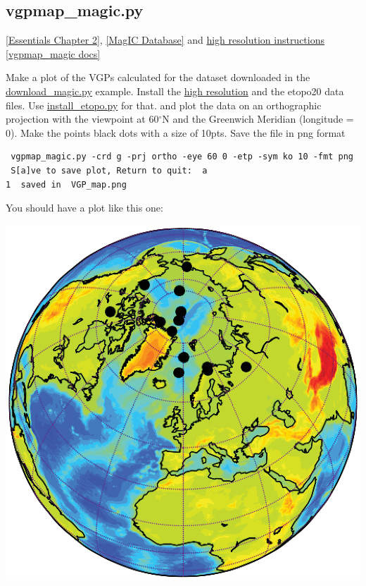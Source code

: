 \documentclass[11pt]{book}
\begin{document}
{

\subsection{vgpmap\_magic.py}
\href{http://earthref.org/MAGIC/books/Tauxe/Essentials/WebBook3ch2.html#ch2}{[Essentials Chapter 2]},  \href{#MagICDatabase}{[MagIC Database]} and   \href{#hires}{high resolution instructions}
\href{https://github.com/PmagPy/PmagPy/blob/master/programs/vgpmap_magic.py}{[vgpmap\_magic docs]}

Make a plot of the VGPs calculated for the dataset downloaded in the \href{#download_magic.py}{download\_magic.py} example.  Install the  \href{#hires}{high resolution} and the etopo20 data files. Use \href{#install_etopo.py}{install\_etopo.py}  for that.
and plot the data on an orthographic projection with the viewpoint at 60$^{\circ}$N and the Greenwich Meridian (longitude = 0).  Make the points black dots with a size of 10pts.   Save the file in png format

\begin{verbatim}
 vgpmap_magic.py -crd g -prj ortho -eye 60 0 -etp -sym ko 10 -fmt png
 S[a]ve to save plot, Return to quit:  a
1  saved in  VGP_map.png
\end{verbatim}



You should have a plot like this one:

\includegraphics[width=15cm]{EPSfiles/VGP_map.eps}

}
\end{document}
